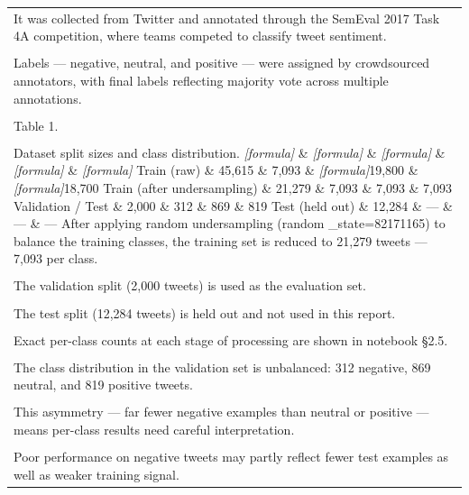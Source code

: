 \documentclass[11pt]{article}
\begin{document}
\begin{longtable}{|p{\dimexpr\linewidth-2\tabcolsep-2\arrayrulewidth\relax}|}
\hline
\rule{0pt}{3.5cm} \\
\hline
It was collected from Twitter and annotated through the SemEval 2017 Task 4A competition, where teams competed to classify tweet sentiment. \\[2pt]
\hline
\rule{0pt}{3.5cm} \\
\hline
Labels --- negative, neutral, and positive --- were assigned by crowdsourced annotators, with final labels reflecting majority vote across multiple annotations. \\[2pt]
\hline
\rule{0pt}{3.5cm} \\
\hline
Table 1. \\[2pt]
\hline
\rule{0pt}{3.5cm} \\
\hline
Dataset split sizes and class distribution. \textit{[formula]} \& \textit{[formula]} \& \textit{[formula]} \& \textit{[formula]} \& \textit{[formula]} Train (raw) \& 45,615 \& 7,093 \& \textit{[formula]}19,800 \& \textit{[formula]}18,700 Train (after undersampling) \& 21,279 \& 7,093 \& 7,093 \& 7,093 Validation / Test \& 2,000 \& 312 \& 869 \& 819 Test (held out) \& 12,284 \& --- \& --- \& --- After applying random undersampling (random \_state=82171165) to balance the training classes, the training set is reduced to 21,279 tweets --- 7,093 per class. \\[2pt]
\hline
\rule{0pt}{3.5cm} \\
\hline
The validation split (2,000 tweets) is used as the evaluation set. \\[2pt]
\hline
\rule{0pt}{3.5cm} \\
\hline
The test split (12,284 tweets) is held out and not used in this report. \\[2pt]
\hline
\rule{0pt}{3.5cm} \\
\hline
Exact per-class counts at each stage of processing are shown in notebook §2.5. \\[2pt]
\hline
\rule{0pt}{3.5cm} \\
\hline
The class distribution in the validation set is unbalanced: 312 negative, 869 neutral, and 819 positive tweets. \\[2pt]
\hline
\rule{0pt}{3.5cm} \\
\hline
This asymmetry --- far fewer negative examples than neutral or positive --- means per-class results need careful interpretation. \\[2pt]
\hline
\rule{0pt}{3.5cm} \\
\hline
Poor performance on negative tweets may partly reflect fewer test examples as well as weaker training signal. \\[2pt]

\end{longtable}
\end{document}
